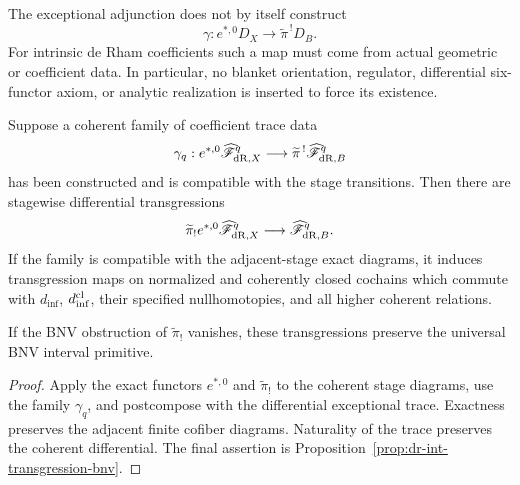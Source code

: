 \begin{remark}
\label{rem:dr-int-transgression-no-formal-orientation}
The exceptional adjunction does not by itself construct
\[
    \gamma:
    e^{*,0}D_X
    \longrightarrow
    \widetilde\pi^{\,!}D_B.
\]
For intrinsic de Rham coefficients such a map must come from actual geometric
or coefficient data.  In particular, no blanket orientation, regulator,
differential six-functor axiom, or analytic realization is inserted to force
its existence.
\end{remark}

\begin{proposition}
\label{prop:dr-int-coherent-transgression}
Suppose a coherent family of coefficient trace data
\[
    \gamma_q:
    e^{*,0}\widehat{\mathscr F}_{\mathrm{dR},X}^{q}
    \longrightarrow
    \widetilde\pi^{\,!}
    \widehat{\mathscr F}_{\mathrm{dR},B}^{q}
\]
has been constructed and is compatible with the stage transitions.  Then
there are stagewise differential transgressions
\[
    \widetilde\pi_!
    e^{*,0}\widehat{\mathscr F}_{\mathrm{dR},X}^{q}
    \longrightarrow
    \widehat{\mathscr F}_{\mathrm{dR},B}^{q}.
\]
If the family is compatible with the adjacent-stage exact diagrams, it induces
transgression maps on normalized and coherently closed cochains which commute
with \(d_{\inf}\), \(d_{\inf}^{\mathrm{cl}}\), their specified nullhomotopies, and all
higher coherent relations.

If the BNV obstruction of \(\widetilde\pi_!\) vanishes, these transgressions
preserve the universal BNV interval primitive.
\end{proposition}

\begin{proof}
Apply the exact functors \(e^{*,0}\) and \(\widetilde\pi_!\) to the coherent
stage diagrams, use the family \(\gamma_q\), and postcompose with the
differential exceptional trace.  Exactness preserves the adjacent finite
cofiber diagrams.  Naturality of the trace preserves the coherent
differential.  The final assertion is
Proposition~\ref{prop:dr-int-transgression-bnv}.
\end{proof}

